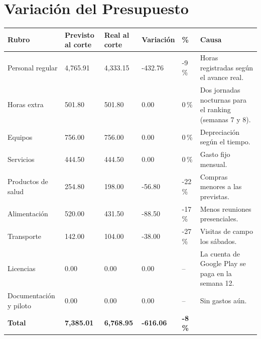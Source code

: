 \documentclass[11pt,a4paper]{article}
\begin{document}
\section{Variación del Presupuesto}
{\footnotesize
\setlength{\tabcolsep}{3.5pt}
\noindent\begin{tabularx}{\textwidth}{@{}P{2.7cm} Q{1.6cm} Q{1.6cm} Q{1.5cm} Q{1.0cm} L@{}}
\toprule
{}
\textbf{Rubro} & \textbf{Previsto al corte} & \textbf{Real al corte} & \textbf{Variación} & \textbf{\%} & \textbf{Causa} \\
\midrule
Personal regular & 4,765.91 & 4,333.15 & -432.76 & -9\,\% & Horas registradas según el avance real. \\
Horas extra & 501.80 & 501.80 & 0.00 & 0\,\% & Dos jornadas nocturnas para el ranking (semanas 7 y 8). \\
Equipos & 756.00 & 756.00 & 0.00 & 0\,\% & Depreciación según el tiempo. \\
Servicios & 444.50 & 444.50 & 0.00 & 0\,\% & Gasto fijo mensual. \\
Productos de salud & 254.80 & 198.00 & -56.80 & -22\,\% & Compras menores a las previstas. \\
Alimentación & 520.00 & 431.50 & -88.50 & -17\,\% & Menos reuniones presenciales. \\
Transporte & 142.00 & 104.00 & -38.00 & -27\,\% & Visitas de campo los sábados. \\
Licencias & 0.00 & 0.00 & 0.00 & -- & La cuenta de Google Play se paga en la semana 12. \\
Documentación y piloto & 0.00 & 0.00 & 0.00 & -- & Sin gastos aún. \\
\midrule
{}\textbf{Total} & \textbf{7,385.01} & \textbf{6,768.95} & \textbf{-616.06} & \textbf{-8\,\%} & \\
\bottomrule
\end{tabularx}
}

\end{document}
